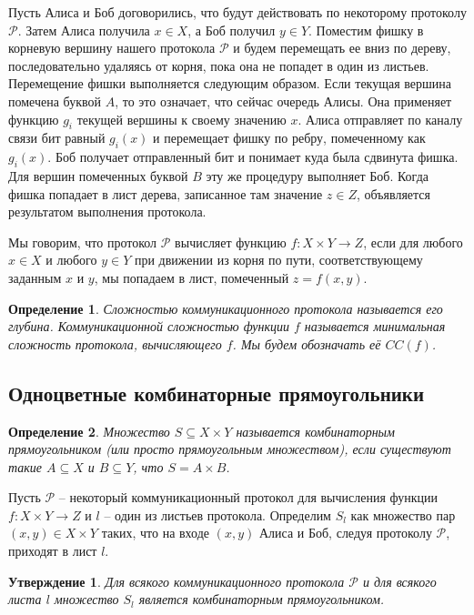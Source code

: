 \documentclass[a4paper]{article}
\newtheorem*{mclaim}{Утверждение}
\newtheorem*{mdefinition}{Определение}
\begin{document}
Пусть Алиса и Боб договорились, что будут действовать по некоторому протоколу $\mathcal{P}$. Затем
Алиса получила $x\in X$, а Боб получил $y\in Y$. Поместим фишку в корневую вершину нашего протокола
$\mathcal{P}$ и будем перемещать ее вниз по дереву, последовательно удаляясь от корня,
пока она не попадет в один из листьев. Перемещение фишки выполняется следующим образом. Если текущая 
вершина помечена буквой $A$, то это означает, что сейчас очередь Алисы. Она применяет функцию $g_i$ текущей 
вершины к своему значению $x$. Алиса отправляет по каналу связи бит равный $g_i(x)$ и перемещает
фишку по ребру, помеченному как $g_i(x)$. Боб получает отправленный бит и понимает куда была сдвинута фишка.
Для вершин помеченных буквой $B$ эту же процедуру выполняет Боб. Когда фишка попадает в лист дерева,
записанное там значение $z\in Z$, объявляется результатом выполнения протокола.

Мы говорим, что протокол $\mathcal{P}$ вычисляет функцию $f:X\times Y \rightarrow Z$, если для любого
$x\in X$ и любого $y\in Y$ при движении из корня по пути, соответствующему заданным $x$ и $y$,
мы попадаем в лист, помеченный $z=f(x,y)$.

\begin{mdefinition}
	Сложностью коммуникационного протокола называется его глубина. Коммуникационной сложностью функции 
	$f$ называется минимальная сложность протокола, вычисляющего $f$. Мы будем обозначать её $CC(f)$.
\end{mdefinition}


\subsection{Одноцветные комбинаторные прямоугольники}
\begin{mdefinition}
	Множество $S \subseteq X\times Y$ называется комбинаторным прямоугольником (или просто прямоугольным
	множеством), если существуют такие $A \subseteq X$ и $B \subseteq Y$, что $S = A\times B$.
\end{mdefinition}

Пусть $\mathcal{P}$ -- некоторый коммуникационный протокол для вычисления функции $f:X\times Y \rightarrow Z$ 
и $l$ -- один из листьев протокола. Определим $S_l$ как множество пар $(x, y) \in X\times Y$ таких, что 
на входе $(x,y)$ Алиса и Боб, следуя протоколу $\mathcal{P}$, приходят в лист $l$.

\begin{mclaim}
    Для всякого коммуникационного протокола $\mathcal{P}$ и для всякого листа $l$ множество $S_l$
    является комбинаторным прямоугольником. 
\end{mclaim}
\end{document}

